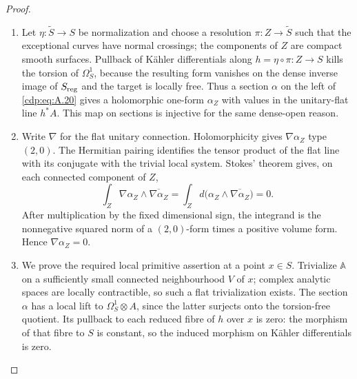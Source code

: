 \begin{proof}

\begin{enumerate}[label={$\langle1\rangle$\arabic*.},leftmargin=*]
\item Let $\eta:\widetilde S\to S$ be normalization and choose a resolution $\pi:Z\to\widetilde S$ such that the exceptional curves have normal crossings; the components of $Z$ are compact smooth surfaces. Pullback of Kähler differentials along $h=\eta\circ\pi:Z\to S$ kills the torsion of $\Omega_S^1$, because the resulting form vanishes on the dense inverse image of $S_{\rm reg}$ and the target is locally free. Thus a section $\alpha$ on the left of \eqref{cdp:eq:A.20} gives a holomorphic one-form $\alpha_Z$ with values in the unitary-flat line $h^*A$. This map on sections is injective for the same dense-open reason.

\item Write $\nabla$ for the flat unitary connection. Holomorphicity gives $\nabla\alpha_Z$ type $(2,0)$. The Hermitian pairing identifies the tensor product of the flat line with its conjugate with the trivial local system. Stokes' theorem gives, on each connected component of $Z$,
\[
 \int_Z \nabla\alpha_Z\wedge\overline{\nabla\alpha_Z}
 =\int_Z d\bigl(\alpha_Z\wedge\overline{\nabla\alpha_Z}\bigr)=0.
\]
After multiplication by the fixed dimensional sign, the integrand is the nonnegative squared norm of a $(2,0)$-form times a positive volume form. Hence $\nabla\alpha_Z=0$.

\item We prove the required local primitive assertion at a point $x\in S$. Trivialize $\mathbb A$ on a sufficiently small connected neighbourhood $V$ of $x$; complex analytic spaces are locally contractible, so such a flat trivialization exists. The section $\alpha$ has a local lift to $\Omega_S^1\otimes A$, since the latter surjects onto the torsion-free quotient. Its pullback to each reduced fibre of $h$ over $x$ is zero: the morphism of that fibre to $S$ is constant, so the induced morphism on Kähler differentials is zero.


\end{enumerate}
\end{proof}
